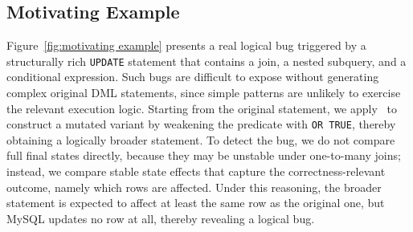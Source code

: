 

\subsection{Motivating Example}
Figure~\ref{fig:motivating example} presents a real logical bug triggered by a structurally rich \texttt{UPDATE} statement that contains a join, a nested subquery, and a conditional expression. 
Such bugs are difficult to expose without generating complex original DML statements, since simple patterns are unlikely to exercise the relevant execution logic. 
Starting from the original statement, we apply \model\ to construct a mutated variant by weakening the predicate with \texttt{OR TRUE}, thereby obtaining a logically broader statement. 
To detect the bug, we do not compare full final states directly, because they may be unstable under one-to-many joins; instead, we compare stable state effects that capture the correctness-relevant outcome, namely which rows are affected. 
Under this reasoning, the broader statement is expected to affect at least the same row as the original one, but MySQL updates no row at all, thereby revealing a logical bug.








